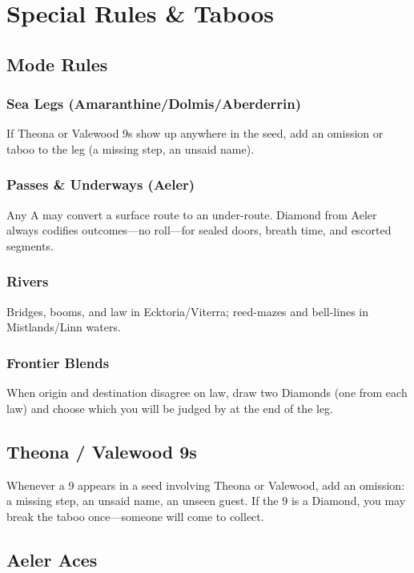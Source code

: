 \documentclass[11pt,letterpaper,twoside]{book}
\begin{document}
\section{Special Rules \& Taboos}

\subsection{Mode Rules}

\subsubsection{Sea Legs (Amaranthine/Dolmis/Aberderrin)}
If Theona or Valewood 9s show up anywhere in the seed, add an omission or taboo to the leg (a missing step, an unsaid name).

\subsubsection{Passes \& Underways (Aeler)}
Any A may convert a surface route to an under-route. Diamond from Aeler always codifies outcomes---no roll---for sealed doors, breath time, and escorted segments.

\subsubsection{Rivers}
Bridges, booms, and law in Ecktoria/Viterra; reed-mazes and bell-lines in Mistlands/Linn waters.

\subsubsection{Frontier Blends}
When origin and destination disagree on law, draw two Diamonds (one from each law) and choose which you will be judged by at the end of the leg.

\subsection{Theona / Valewood 9s}

Whenever a 9 appears in a seed involving Theona or Valewood, add an omission: a missing step, an unsaid name, an unseen guest. If the 9 is a Diamond, you may break the taboo once---someone will come to collect.

\subsection{Aeler Aces}
\end{document}
